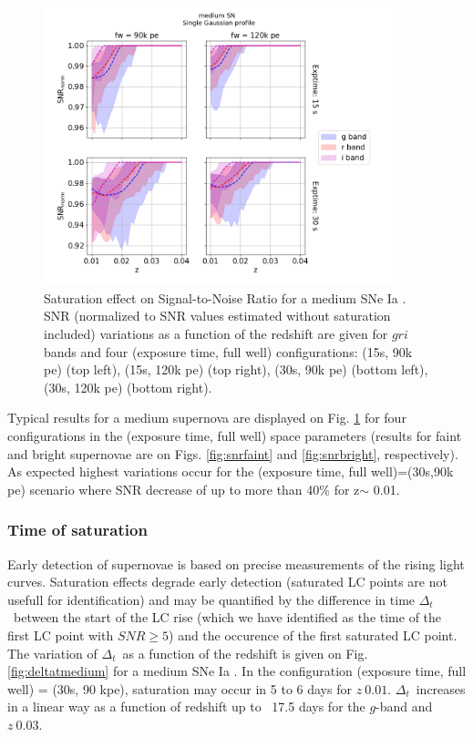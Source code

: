 \documentclass[\docopts]{\docclass}
\newcommand{\sne}{{SNe Ia }}
\newcommand{\pe}{{pe}}
\newcommand{\deltat}{{$\Delta_{t}$}}
\begin{document}
\begin{figure}[htbp]
\begin{center}
  \includegraphics[width=0.9\textwidth]{SNR_medium_single_gaussian.png}
 \caption{Saturation effect on Signal-to-Noise Ratio for a medium \sne. SNR (normalized to SNR values estimated without saturation included) variations as a function of the redshift are given for $gri$ bands and four (exposure time, full well) configurations: (15s, 90k \pe) (top left),  (15s, 120k \pe) (top right), (30s, 90k \pe) (bottom left),  (30s, 120k \pe) (bottom right).}\label{fig:snrmedium}
\end{center}
\end{figure}

Typical results for a medium supernova are displayed on Fig. \ref{fig:snrmedium} for four configurations in the (exposure time, full well) space parameters (results for faint and bright supernovae are on Figs. \ref{fig:snrfaint} and  \ref{fig:snrbright}, respectively). As expected highest variations occur for the (exposure time, full well)=(30s,90k \pe) scenario where SNR decrease of up to more than 40\% for z$\sim$ 0.01. 

\subsubsection{Time of saturation}

Early detection of supernovae is based on precise measurements of the rising light curves. Saturation effects degrade early detection (saturated LC points are not usefull for identification) and may be quantified by the difference in time \deltat~between the start of the LC rise (which we have identified as the time of the first LC point with $SNR \geq 5$) and the occurence of the first saturated LC point. The variation of  \deltat~as a function of the redshift is given on Fig. \ref{fig:deltatmedium} for a medium \sne. In the configuration (exposure time, full well) = (30s, 90 k\pe), saturation may occur in 5 to 6 days for $z ~0.01$.  \deltat~increases in a linear way as a function of redshift up to ~17.5 days for the $g$-band and $z~0.03$.
\end{document}
